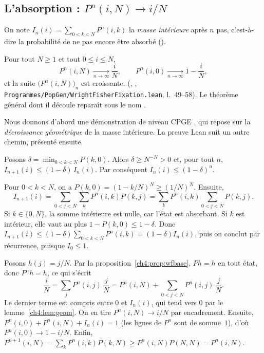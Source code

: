\subsection{L'absorption : \texorpdfstring{$P^n(i,N)\to i/N$}{P\^{}n(i,N) -> i/N}}
On note $I_n(i)=\sum_{0<k<N}P^n(i,k)$ la \emph{masse intérieure} après $n$ pas, c'est-à-dire la probabilité de ne
pas encore être absorbé ().

\begin{theorem}\label{ch4:thm:wflim}
Pour tout $N\ge1$ et tout $0\le i\le N$,
\[
P^n(i,N)\xrightarrow[n\to\infty]{}\frac iN,\qquad P^n(i,0)\xrightarrow[n\to\infty]{}1-\frac iN,
\]
et la suite $\bigl(P^n(i,N)\bigr)_n$ est croissante. \tierA{} (,
, \texttt{Programmes/PopGen/}\allowbreak\texttt{WrightFisherFixation.lean}, l.~49--58). Le théorème général  dont il découle reparaît sous le nom .
\end{theorem}

Nous donnons d'abord une démonstration de niveau CPGE \tierC, qui repose sur la \emph{décroissance géométrique}
de la masse intérieure. La preuve Lean suit un autre chemin, présenté ensuite.

\begin{lemma}\label{ch4:lem:geom}
Posons $\delta=\min_{0<k<N}P(k,0)$. Alors $\delta\ge N^{-N}>0$ et, pour tout $n$, $I_{n+1}(i)\le(1-\delta)\,I_n(i)$.
Par conséquent $I_n(i)\le(1-\delta)^n$.
\end{lemma}

\begin{humanproof}
Pour $0<k<N$, on a $P(k,0)=(1-k/N)^N\ge(1/N)^N$. Ensuite,
\[
I_{n+1}(i)=\sum_{0<j<N}\sum_kP^n(i,k)P(k,j)=\sum_kP^n(i,k)\sum_{0<j<N}P(k,j).
\]
Si $k\in\{0,N\}$, la somme intérieure est nulle, car l'état est absorbant. Si $k$ est intérieur, elle vaut au plus
$1-P(k,0)\le1-\delta$. Donc $I_{n+1}(i)\le(1-\delta)\sum_{0<k<N}P^n(i,k)=(1-\delta)I_n(i)$, puis on conclut par
récurrence, puisque $I_0\le1$.
\end{humanproof}

\begin{humanproof}
Posons $h(j)=j/N$. Par la proposition~\ref{ch4:prop:wfbase}, $Ph=h$ en tout état, donc $P^nh=h$, ce qui s'écrit
\[
\frac iN=\sum_jP^n(i,j)\,\frac jN=P^n(i,N)+\sum_{0<j<N}P^n(i,j)\,\frac jN .
\]
Le dernier terme est compris entre $0$ et $I_n(i)$, qui tend vers $0$ par le lemme~\ref{ch4:lem:geom}. On en tire
$P^n(i,N)\to i/N$ par encadrement. Ensuite, $P^n(i,0)+P^n(i,N)+I_n(i)=1$ (les lignes de $P^n$ sont de somme~$1$),
d'où $P^n(i,0)\to1-i/N$. Enfin, $P^{n+1}(i,N)=\sum_kP^n(i,k)P(k,N)\ge P^n(i,N)P(N,N)=P^n(i,N)$.
\end{humanproof}

